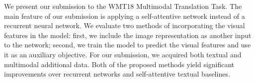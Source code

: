 We present our submission to the WMT18 Multimodal Translation Task. The main feature of our submission is applying a self-attentive network instead of a recurrent neural network. We evaluate two methods of incorporating the visual features in the model: first, we include the image representation as another input to the network; second, we train the model to predict the visual features and use it as an auxiliary objective. For our submission, we acquired both textual and multimodal additional data.  Both of the proposed methods yield significant improvements over recurrent networks and self-attentive textual baselines.
